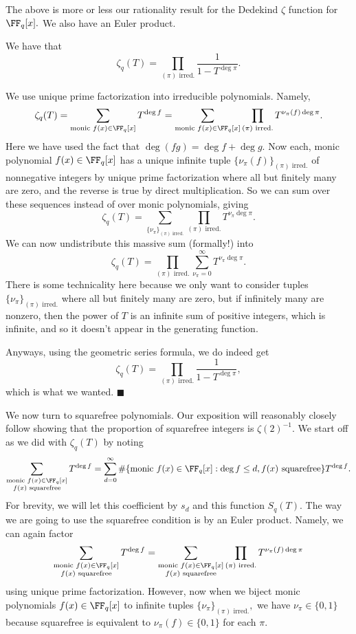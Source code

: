 The above is more or less our rationality result for the Dedekind $\zeta$ function for $\FF_q[x].$ We also have an Euler product.
\begin{lemma}
    We have that
    \[\zeta_q(T)=\prod_{(\pi)\text{ irred.}}\frac1{1-T^{\deg\pi}}.\]
\end{lemma}
We use unique prime factorization into irreducible polynomials. Namely,
\[\zeta_q(T)=\sum_{\text{monic }f(x)\in\FF_q[x]}T^{\deg f}=\sum_{\text{monic }f(x)\in\FF_q[x]}\prod_{(\pi)\text{ irred.}}T^{\nu_\pi(f)\deg\pi}.\]
Here we have used the fact that $\deg(fg)=\deg f+\deg g.$ Now each, monic polynomial $f(x)\in\FF_q[x]$ has a unique infinite tuple $\{\nu_\pi(f)\}_{(\pi)\text{ irred.}}$ of nonnegative integers by unique prime factorization where all but finitely many are zero, and the reverse is true by direct multiplication. So we can sum over these sequences instead of over monic polynomials, giving
\[\zeta_q(T)=\sum_{\{\nu_\pi\}_{(\pi)\text{ irred.}}}\prod_{(\pi)\text{ irred.}}T^{\nu_\pi\deg\pi}.\]
We can now undistribute this massive sum (formally!) into
\[\zeta_q(T)=\prod_{(\pi)\text{ irred.}}\sum_{\nu_\pi=0}^\infty T^{\nu_\pi\deg\pi}.\]
There is some technicality here because we only want to consider tuples $\{\nu_\pi\}_{(\pi)\text{ irred.}}$ where all but finitely many are zero, but if infinitely many are nonzero, then the power of $T$ is an infinite sum of positive integers, which is infinite, and so it doesn't appear in the generating function.

Anyways, using the geometric series formula, we do indeed get
\[\zeta_q(T)=\prod_{(\pi)\text{ irred.}}\frac1{1-T^{\deg\pi}},\]
which is what we wanted. $\blacksquare$

We now turn to squarefree polynomials. Our exposition will reasonably closely follow showing that the proportion of squarefree integers is $\zeta(2)^{-1}.$ We start off as we did with $\zeta_q(T)$ by noting
\[\sum_{\substack{\text{monic }f(x)\in\FF_q[x]\\f(x)\text{ squarefree}}}T^{\deg f}=\sum_{d=0}^\infty\#\{\text{monic }f(x)\in\FF_q[x]:\deg f\le d,f(x)\text{ squarefree}\}T^{\deg f}.\]
For brevity, we will let this coefficient by $s_d$ and this function $S_q(T).$ The way we are going to use the squarefree condition is by an Euler product. Namely, we can again factor
\[\sum_{\substack{\text{monic }f(x)\in\FF_q[x]\\f(x)\text{ squarefree}}}T^{\deg f}=\sum_{\substack{\text{monic }f(x)\in\FF_q[x]\\f(x)\text{ squarefree}}}\prod_{(\pi)\text{ irred.}}T^{\nu_\pi(f)\deg\pi}\]
using unique prime factorization. However, now when we biject monic polynomials $f(x)\in\FF_q[x]$ to infinite tuples $\{\nu_\pi\}_{(\pi)\text{ irred.}},$ we have $\nu_\pi\in\{0,1\}$ because squarefree is equivalent to $\nu_\pi(f)\in\{0,1\}$ for each $\pi.$ 

